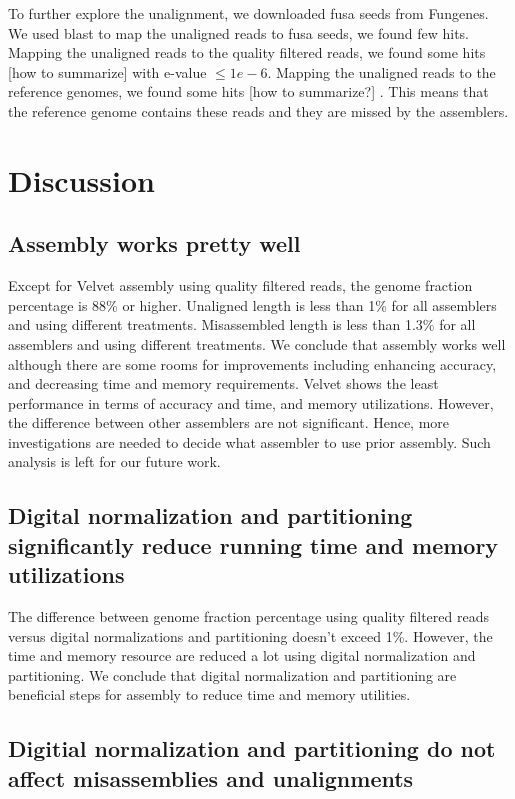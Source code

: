 To further explore the unalignment, we downloaded fusa seeds from Fungenes. We used blast to map the unaligned reads to fusa seeds, we found few hits. Mapping the unaligned reads to the quality filtered reads, we found some hits  [how to summarize] with e-value $\leq 1e-6$. Mapping the unaligned reads to the reference genomes, we found  some hits [how to summarize?] . This means that the reference genome contains these reads and they are missed by the assemblers. 

\section*{Discussion}
 
 \subsection*{Assembly works pretty well} 
 Except for Velvet assembly using quality filtered reads, the genome fraction percentage is  88\% or higher.  Unaligned length is less than 1\% for all assemblers and using different treatments. 
 Misassembled length is less than 1.3\% for all assemblers and using different treatments. We conclude that assembly works well although there are some rooms for improvements including enhancing accuracy, and decreasing time and memory requirements. Velvet shows the least performance in terms of accuracy and time, and memory utilizations. However, the difference between other assemblers are not significant. Hence, more investigations are needed to decide what assembler to use prior assembly. Such analysis is left for our future work. 
 
 \subsection*{Digital normalization and partitioning significantly reduce running time and memory utilizations}
 
The difference between genome fraction percentage using quality filtered reads versus digital normalizations and partitioning doesn't exceed 1\%. However, the time and memory resource are reduced a lot using digital normalization and partitioning. We conclude that digital normalization and partitioning are beneficial steps for assembly to reduce time and memory utilities. 
 
 \subsection*{Digitial normalization and partitioning do not  affect misassemblies and unalignments}
 
